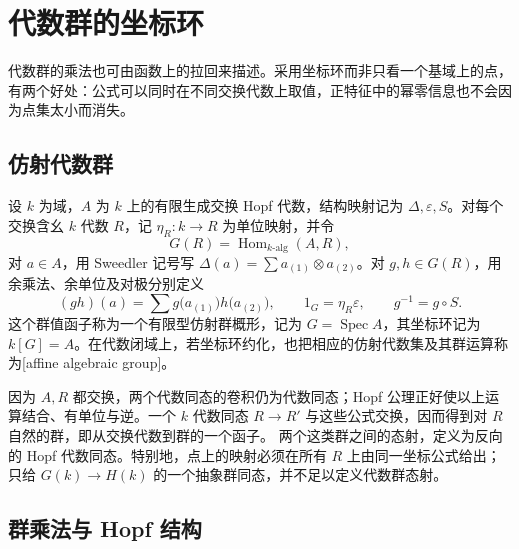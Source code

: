 
\section{代数群的坐标环}
\label{b5:sec:2102}


%
%

代数群的乘法也可由函数上的拉回来描述。采用坐标环而非只看一个基域上的点，有两个好处：公式可以同时在不同交换代数上取值，正特征中的幂零信息也不会因为点集太小而消失。

\subsection{仿射代数群}
\label{b5:subsec:2102:01}

\begin{definition}\label{b5:def:affine-group}
	设 \(k\) 为域，\(A\) 为 \(k\) 上的有限生成交换 Hopf 代数，结构映射记为 \(\Delta,\varepsilon,S\)。对每个交换含幺 \(k\) 代数 \(R\)，记 \(\eta_R:k\to R\) 为单位映射，并令
	\[
		G(R)=\operatorname{Hom}_{k\text{-alg}}(A,R),
	\]
	对 \(a\in A\)，用 Sweedler 记号写 \(\Delta(a)=\sum a_{(1)}\otimes a_{(2)}\)。对 \(g,h\in G(R)\)，用余乘法、余单位及对极分别定义
	\[
		(gh)(a)=\sum g\bigl(a_{(1)}\bigr)h\bigl(a_{(2)}\bigr),\qquad 1_G=\eta_R\varepsilon,\qquad g^{-1}=g\circ S.
	\]
	这个群值函子称为一个有限型仿射群概形，记为 \(G=\operatorname{Spec}A\)，其坐标环记为 \(k[G]=A\)。在代数闭域上，若坐标环约化，也把相应的仿射代数集及其群运算称为[affine algebraic group]。
\end{definition}
因为 \(A,R\) 都交换，两个代数同态的卷积仍为代数同态；Hopf 公理正好使以上运算结合、有单位与逆。一个 \(k\) 代数同态 \(R\to R'\) 与这些公式交换，因而得到对 \(R\) 自然的群，即从交换代数到群的一个函子。
\ProseParagraphBreak
两个这类群之间的态射，定义为反向的 Hopf 代数同态。特别地，点上的映射必须在所有 \(R\) 上由同一坐标公式给出；只给 \(G(k)\to H(k)\) 的一个抽象群同态，并不足以定义代数群态射。

\subsection{群乘法与 Hopf 结构}
\label{b5:subsec:2102:02}

